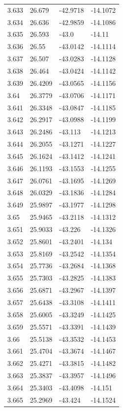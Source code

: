 \begin{tabular}{llll}
3.633 & 26.679 & -42.9718 & -14.1072 \\
3.634 & 26.636 & -42.9859 & -14.1086 \\
3.635 & 26.593 & -43.0 & -14.11 \\
3.636 & 26.55 & -43.0142 & -14.1114 \\
3.637 & 26.507 & -43.0283 & -14.1128 \\
3.638 & 26.464 & -43.0424 & -14.1142 \\
3.639 & 26.4209 & -43.0565 & -14.1156 \\
3.64 & 26.3779 & -43.0706 & -14.1171 \\
3.641 & 26.3348 & -43.0847 & -14.1185 \\
3.642 & 26.2917 & -43.0988 & -14.1199 \\
3.643 & 26.2486 & -43.113 & -14.1213 \\
3.644 & 26.2055 & -43.1271 & -14.1227 \\
3.645 & 26.1624 & -43.1412 & -14.1241 \\
3.646 & 26.1193 & -43.1553 & -14.1255 \\
3.647 & 26.0761 & -43.1695 & -14.1269 \\
3.648 & 26.0329 & -43.1836 & -14.1284 \\
3.649 & 25.9897 & -43.1977 & -14.1298 \\
3.65 & 25.9465 & -43.2118 & -14.1312 \\
3.651 & 25.9033 & -43.226 & -14.1326 \\
3.652 & 25.8601 & -43.2401 & -14.134 \\
3.653 & 25.8169 & -43.2542 & -14.1354 \\
3.654 & 25.7736 & -43.2684 & -14.1368 \\
3.655 & 25.7303 & -43.2825 & -14.1383 \\
3.656 & 25.6871 & -43.2967 & -14.1397 \\
3.657 & 25.6438 & -43.3108 & -14.1411 \\
3.658 & 25.6005 & -43.3249 & -14.1425 \\
3.659 & 25.5571 & -43.3391 & -14.1439 \\
3.66 & 25.5138 & -43.3532 & -14.1453 \\
3.661 & 25.4704 & -43.3674 & -14.1467 \\
3.662 & 25.4271 & -43.3815 & -14.1482 \\
3.663 & 25.3837 & -43.3957 & -14.1496 \\
3.664 & 25.3403 & -43.4098 & -14.151 \\
3.665 & 25.2969 & -43.424 & -14.1524 \\

\end{tabular}
